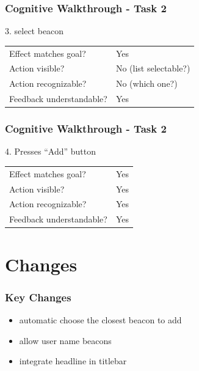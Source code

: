 \documentclass{beamer}
\begin{document}
\begin{frame}
  \frametitle{Cognitive Walkthrough - Task 2}
  3. select beacon

  \vspace{10pt}
  \begin{tabular}{ll}
    Effect matches goal?     & Yes \\
    Action visible?          & No (list selectable?) \\
    Action recognizable?     & No (which one?) \\
    Feedback understandable? & Yes \\
  \end{tabular}
\end{frame}

\begin{frame}
  \frametitle{Cognitive Walkthrough - Task 2}
  4. Presses ``Add'' button 

  \vspace{10pt}
  \begin{tabular}{ll}
    Effect matches goal?     & Yes \\
    Action visible?          & Yes \\
    Action recognizable?     & Yes \\
    Feedback understandable? & Yes \\
  \end{tabular}
\end{frame}




\section{Changes}
\begin{frame}
  \frametitle{Key Changes}
  \begin{itemize}
  \item automatic choose the closest beacon to add
  \item allow user name beacons
  \item integrate headline in titlebar
  \end{itemize}          
\end{frame}


\end{document}
